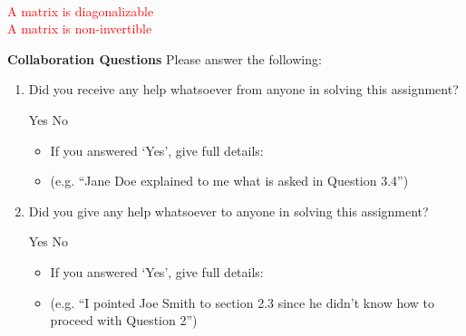 \documentclass[11pt,addpoints,answers]{exam}
\numberwithin{equation}{section} %
\numberwithin{figure}{section} %
\numberwithin{table}{section} %
\begin{document}
\begin{questions}
\begin{tcolorbox}[fit,height=14cm, width=\textwidth, blank, borderline={0.5pt}{-2pt},halign=center, valign=center, nobeforeafter]
    \\
    \textcolor{red}{A matrix is diagonalizable}\\
    
     \textcolor{red}{A matrix is non-invertible}
    
    \end{tcolorbox}     
    
\end{questions}

\clearpage

\textbf{Collaboration Questions} Please answer the following:

\begin{enumerate}
    \item Did you receive any help whatsoever from anyone in solving this assignment?
    \begin{checkboxes}
     \CorrectChoice Yes
     \choice No
    \end{checkboxes}
    \begin{itemize}
        \item If you answered `Yes', give full details:
        \item (e.g. “Jane Doe explained to me what is asked in Question 3.4”)
    \end{itemize}

    \begin{tcolorbox}[fit,height=3cm,blank, borderline={1pt}{-2pt},nobeforeafter]
    \end{tcolorbox}

    \item Did you give any help whatsoever to anyone in solving this assignment?
    \begin{checkboxes}
     \CorrectChoice Yes
     \choice No
    \end{checkboxes}
    \begin{itemize}
        \item If you answered `Yes', give full details:
        \item (e.g. “I pointed Joe Smith to section 2.3 since he didn’t know how to proceed with Question 2”)
    \end{itemize}

    \begin{tcolorbox}[fit,height=3cm,blank, borderline={1pt}{-2pt},nobeforeafter]
    \end{tcolorbox}


\end{enumerate}
\end{document}
